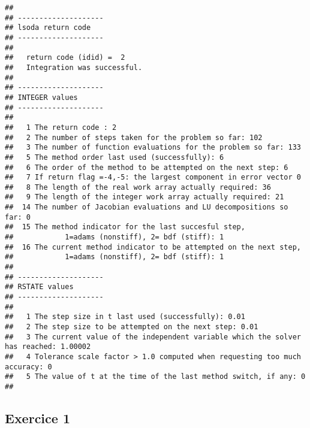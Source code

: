 \documentclass[
]{article}
\begin{document}
\begin{verbatim}
## 
## --------------------
## lsoda return code
## --------------------
## 
##   return code (idid) =  2 
##   Integration was successful.
## 
## --------------------
## INTEGER values
## --------------------
## 
##   1 The return code : 2 
##   2 The number of steps taken for the problem so far: 102 
##   3 The number of function evaluations for the problem so far: 133 
##   5 The method order last used (successfully): 6 
##   6 The order of the method to be attempted on the next step: 6 
##   7 If return flag =-4,-5: the largest component in error vector 0 
##   8 The length of the real work array actually required: 36 
##   9 The length of the integer work array actually required: 21 
##  14 The number of Jacobian evaluations and LU decompositions so far: 0 
##  15 The method indicator for the last succesful step,
##            1=adams (nonstiff), 2= bdf (stiff): 1 
##  16 The current method indicator to be attempted on the next step,
##            1=adams (nonstiff), 2= bdf (stiff): 1 
##  
## --------------------
## RSTATE values
## --------------------
## 
##   1 The step size in t last used (successfully): 0.01 
##   2 The step size to be attempted on the next step: 0.01 
##   3 The current value of the independent variable which the solver has reached: 1.00002 
##   4 Tolerance scale factor > 1.0 computed when requesting too much accuracy: 0 
##   5 The value of t at the time of the last method switch, if any: 0 
## 
\end{verbatim}

\hypertarget{exercice-1}{%
\subsection{Exercice 1}\label{exercice-1}}
\end{document}
